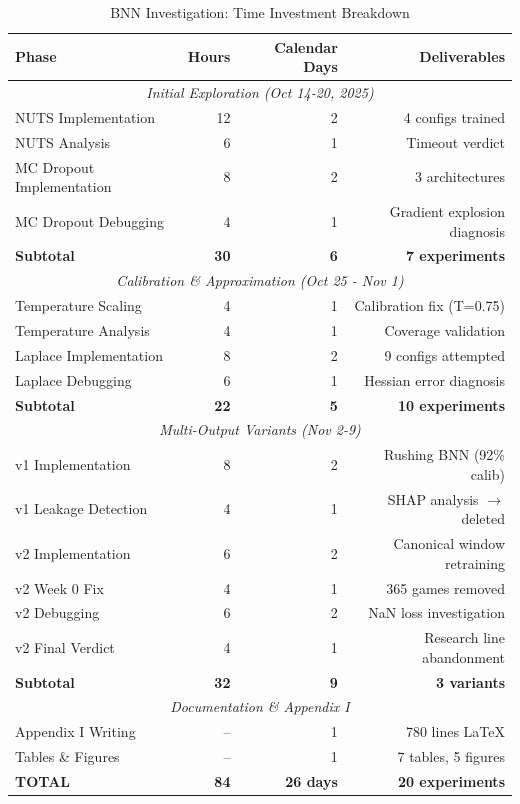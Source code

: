 
\begin{table}[htbp]
\centering
\caption{BNN Investigation: Time Investment Breakdown}
\label{tab:time_investment_summary}
\begin{tabular}{lrrr}
\toprule
\textbf{Phase} & \textbf{Hours} & \textbf{Calendar Days} & \textbf{Deliverables} \\
\midrule
\multicolumn{4}{c}{\textit{Initial Exploration (Oct 14-20, 2025)}} \\
\midrule
NUTS Implementation & 12 & 2 & 4 configs trained \\
NUTS Analysis & 6 & 1 & Timeout verdict \\
MC Dropout Implementation & 8 & 2 & 3 architectures \\
MC Dropout Debugging & 4 & 1 & Gradient explosion diagnosis \\
\midrule
\textbf{Subtotal} & \textbf{30} & \textbf{6} & \textbf{7 experiments} \\
\midrule
\multicolumn{4}{c}{\textit{Calibration \& Approximation (Oct 25 - Nov 1)}} \\
\midrule
Temperature Scaling & 4 & 1 & Calibration fix (T=0.75) \\
Temperature Analysis & 4 & 1 & Coverage validation \\
Laplace Implementation & 8 & 2 & 9 configs attempted \\
Laplace Debugging & 6 & 1 & Hessian error diagnosis \\
\midrule
\textbf{Subtotal} & \textbf{22} & \textbf{5} & \textbf{10 experiments} \\
\midrule
\multicolumn{4}{c}{\textit{Multi-Output Variants (Nov 2-9)}} \\
\midrule
v1 Implementation & 8 & 2 & Rushing BNN (92\% calib) \\
v1 Leakage Detection & 4 & 1 & SHAP analysis $\rightarrow$ deleted \\
v2 Implementation & 6 & 2 & Canonical window retraining \\
v2 Week 0 Fix & 4 & 1 & 365 games removed \\
v2 Debugging & 6 & 2 & NaN loss investigation \\
v2 Final Verdict & 4 & 1 & Research line abandonment \\
\midrule
\textbf{Subtotal} & \textbf{32} & \textbf{9} & \textbf{3 variants} \\
\midrule
\multicolumn{4}{c}{\textit{Documentation \& Appendix I}} \\
\midrule
Appendix I Writing & -- & 1 & 780 lines LaTeX \\
Tables \& Figures & -- & 1 & 7 tables, 5 figures \\
\midrule
\textbf{TOTAL} & \textbf{84} & \textbf{26 days} & \textbf{20 experiments} \\
\bottomrule
\end{tabular}
\vspace{1em}


\end{table}
